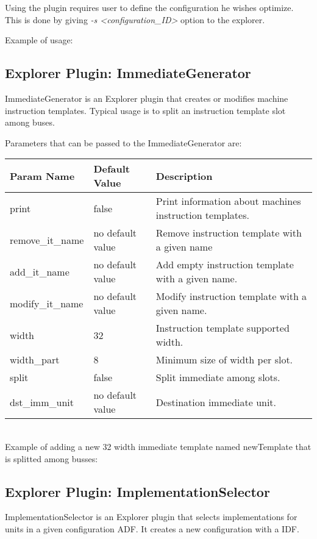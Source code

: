 \documentclass[twoside]{tceusermanual}
\begin{document}
Using the plugin requires user to define the configuration he wishes optimize.
This is done by giving \textit{-s <configuration\_ID>} option to the explorer.

Example of usage:


\subsection{Explorer Plugin: ImmediateGenerator}
ImmediateGenerator is an Explorer plugin that creates or modifies machine
instruction templates. Typical usage is to split an instruction template slot
among buses.

Parameters that can be passed to the ImmediateGenerator are:

\begin{tabular}{p{}p{}
                p{}}
\textbf{Param Name} &\textbf{Default Value} &\textbf{Description} \\
\hline
print & false & Print information about machines instruction templates.\\
remove\_it\_name & no default value & Remove instruction template with a
given name \\
add\_it\_name & no default value & Add empty instruction template with a
given name. \\
modify\_it\_name & no default value & Modify instruction template with a
given name. \\
width & 32 & Instruction template supported width.\\
width\_part & 8 & Minimum size of width per slot.\\
split & false & Split immediate among slots.\\
dst\_imm\_unit & no default value & Destination immediate unit.\\
\end{tabular}\\

Example of adding a new 32 width immediate template named newTemplate that is
splitted among busses:


\subsection{Explorer Plugin: ImplementationSelector}
ImplementationSelector is an Explorer plugin that selects implementations for
units in a given configuration ADF. It creates a new configuration with a IDF.
\end{document}
